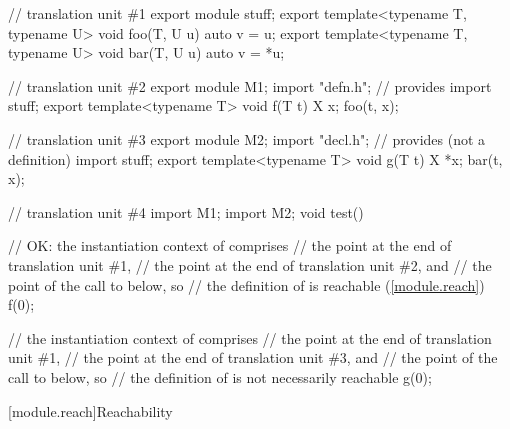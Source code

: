 \begin{std.txt}
\pnum
\begin{example}
\begin{codeblock}
// translation unit \#1
export module stuff;
export template<typename T, typename U> void foo(T, U u) { auto v = u; }
export template<typename T, typename U> void bar(T, U u) { auto v = *u; }

// translation unit \#2
export module M1;
import "defn.h";        // provides 
import stuff;
export template<typename T> void f(T t) {
 X x;
 foo(t, x);
}

// translation unit \#3
export module M2;
import "decl.h";        // provides  (not a definition)
import stuff;
export template<typename T> void g(T t) {
 X *x;
 bar(t, x);
}

// translation unit \#4
import M1;
import M2;
void test() {
  // OK: the instantiation context of  comprises
  // the point at the end of translation unit \#1,
  // the point at the end of translation unit \#2, and
  // the point of the call to  below, so
  // the definition of  is reachable (\ref{module.reach})
  f(0);

  // the instantiation context of  comprises
  // the point at the end of translation unit \#1,
  // the point at the end of translation unit \#3, and
  // the point of the call to  below, so
  // the definition of  is not necessarily reachable
  g(0);
}
\end{codeblock}
\end{example}
\end{std.txt}

[module.reach]{Reachability}


